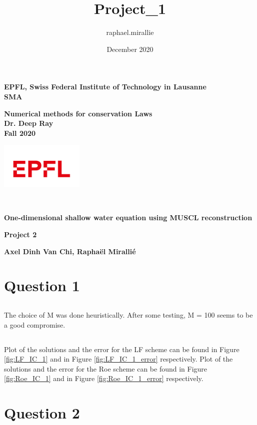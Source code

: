 \documentclass[11pt,a4paper]{article}
\title{Project_1}
\author{raphael.mirallie }
\date{December 2020}
\begin{document}
\noindent \parbox[b]{12 cm}{
  \small
{\bf EPFL, Swiss Federal Institute of Technology in Lausanne} \\
{\bf SMA}

\bigskip

{\bf Numerical methods for conservation Laws}\\
{\bf Dr. Deep Ray}\\
{\bf Fall 2020}

} \hfill \includegraphics[width=4cm]{epfl_logo.jpg}

\noindent\hrulefill\\
\centerline{\large \bf One-dimensional shallow water equation using MUSCL reconstruction}\vspace{2ex}
\centerline{\bf Project 2}
\centerline{\bf  Axel Dinh Van Chi, Rapha\"el Miralli\'e}

\graphicspath{ {pictures/} }


\section{Question 1}

\subsection{}
The choice of M was done heuristically. After some testing, M = 100 seems to be a good compromise.

\subsection{}
Plot of the solutions and the error for the LF scheme can be found in Figure \ref{fig:LF_IC_1} and in Figure \ref{fig:LF_IC_1_error} respectively.
Plot of the solutions and the error for the Roe scheme can be found in Figure \ref{fig:Roe_IC_1} and in Figure \ref{fig:Roe_IC_1_error} respectively.


\section{Question 2}
\end{document}
